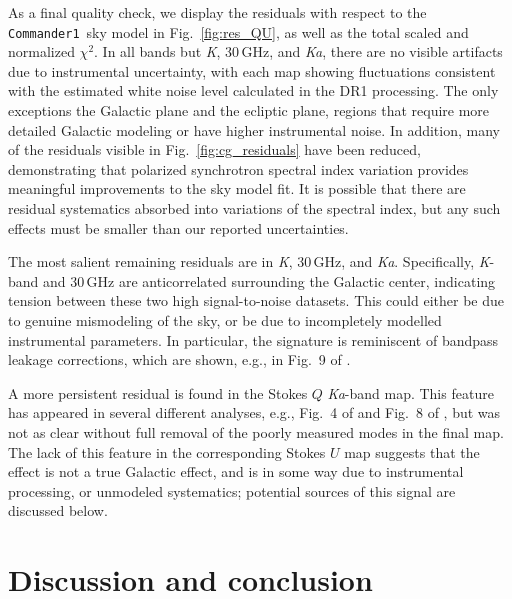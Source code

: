 \documentclass[twocolumn]{../../common/aa}
\def\commanderone{\texttt{Commander1}}
\newcommand{\K}[0]{\textit K}
\newcommand{\Ka}[0]{\textit{Ka}}
\begin{document}


As a final quality check, we display the residuals with respect to the \commanderone\ sky model in Fig.~\ref{fig:res_QU}, as well as the total scaled and normalized $\chi^2$. In all bands but \K, 30\,GHz, and \Ka, there are no visible artifacts due to instrumental uncertainty, with each map showing fluctuations consistent with the estimated white noise level calculated in the DR1 processing. The only exceptions the Galactic plane and the ecliptic plane, regions that require more detailed Galactic modeling or have higher instrumental noise. In addition, many of the residuals visible in Fig.~\ref{fig:cg_residuals} have been reduced, demonstrating that polarized synchrotron spectral index variation provides meaningful improvements to the sky model fit. It is possible that there are residual systematics absorbed into variations of the spectral index, but any such effects must be smaller than our reported uncertainties.

The most salient remaining residuals are in \K, 30\,GHz, and \Ka. Specifically, \K-band and 30\,GHz are anticorrelated surrounding the Galactic center, indicating tension between these two high signal-to-noise datasets. This could either be due to genuine mismodeling of the sky, or be due to incompletely modelled instrumental parameters. In particular, the signature is reminiscent of bandpass leakage corrections, which are shown, e.g., in Fig.~9 of \citet{bp09}.

A more persistent residual is found in the Stokes $Q$ \Ka-band map. This feature has appeared in several different analyses, e.g., Fig.~4 of \citet{bp14} and Fig.~8 of \citet{weiland:2022}, but was not as clear without full removal of the poorly measured modes in the final map. The lack of this feature in the corresponding Stokes $U$ map suggests that the effect is not a true Galactic effect, and is in some way due to instrumental processing, or unmodeled systematics; potential sources of this signal are discussed below.






\section{Discussion and conclusion}
\label{sec:conclusion}
\end{document}
